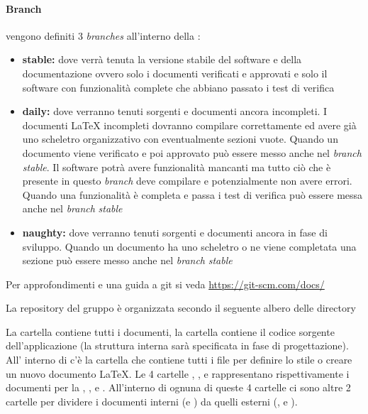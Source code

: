 \documentclass[12pt,a4paper]{article}
\begin{document}
\paragraph{Branch} vengono definiti 3 \textit{branches} all'interno della \textit{}:
\begin{itemize}
	\item \textbf{stable:} dove verrà tenuta la versione stabile del software e della documentazione ovvero solo i documenti verificati e  approvati e solo il software con funzionalità complete che abbiano passato i test di verifica
	\item \textbf{daily:} dove verranno tenuti sorgenti e documenti ancora incompleti. I documenti \LaTeX{} incompleti dovranno compilare correttamente ed avere già uno scheletro organizzativo con eventualmente sezioni vuote. Quando un documento viene verificato e poi approvato può essere messo anche nel \textit{branch} \textit{stable}. Il software potrà avere funzionalità mancanti ma tutto ciò che è presente in questo \textit{branch} deve compilare e potenzialmente non avere errori. Quando una funzionalità è completa e passa i test di verifica può essere messa anche nel \textit{branch} \textit{stable}
	\item \textbf{naughty:} dove verranno tenuti sorgenti e documenti ancora in fase di sviluppo. Quando un documento ha uno scheletro o ne viene completata una sezione può essere messo anche nel \textit{branch} \textit{stable}
\end{itemize}

Per approfondimenti e una guida a git si veda \url{https://git-scm.com/docs/}

La repository del gruppo è organizzata secondo il seguente albero delle directory


La cartella  contiene tutti i documenti, la cartella  contiene il codice sorgente dell'applicazione (la struttura interna sarà specificata in fase di progettazione). All' interno di  c'è la cartella  che contiene tutti i file per definire lo stile o creare un nuovo documento \LaTeX{}. Le 4 cartelle , ,  e  rappresentano rispettivamente i documenti per la \RR, \RP, \RQ e \RA. All'interno di ognuna di queste 4 cartelle ci sono altre 2 cartelle per dividere i documenti interni (\NdP e \SdF) da quelli esterni (\AdR, \PdP e \PdQ).
\end{document}
